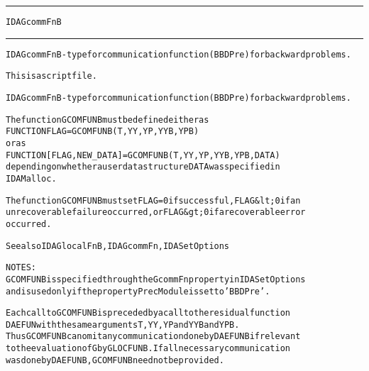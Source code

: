 \begin{samepage}
\hrule
\begin{center}
{\large \verb!IDAGcommFnB!}
\label{p:IDAGcommFnB}
\end{center}
\hrule\vspace{0.1in}



\begin{alltt}
IDAGcommFnB - type for communication function (BBDPre) for backward problems.
\end{alltt}

\end{samepage}



\begin{samepage}


\begin{alltt}
This is a script file. 
\end{alltt}

\end{samepage}



\begin{alltt}
IDAGcommFnB - type for communication function (BBDPre) for backward problems.

   The function GCOMFUNB must be defined either as
        FUNCTION FLAG = GCOMFUNB(T, YY, YP, YYB, YPB)
   or as
        FUNCTION [FLAG, NEW_DATA] = GCOMFUNB(T, YY, YP, YYB, YPB, DATA)
   depending on whether a user data structure DATA was specified in
   IDAMalloc. 

   The function GCOMFUNB must set FLAG=0 if successful, FLAG&lt;0 if an
   unrecoverable failure occurred, or FLAG&gt;0 if a recoverable error
   occurred.

   See also IDAGlocalFnB, IDAGcommFn, IDASetOptions

   NOTES:
     GCOMFUNB is specified through the GcommFn property in IDASetOptions
     and is used only if the property PrecModule is set to 'BBDPre'.

     Each call to GCOMFUNB is preceded by a call to the residual function
     DAEFUN with the same arguments T, YY, YP and YYB and YPB.
     Thus GCOMFUNB can omit any communication done by DAEFUNB if relevant
     to the evaluation of G by GLOCFUNB. If all necessary communication
     was done by DAEFUNB, GCOMFUNB need not be provided.
\end{alltt}






\vspace{0.1in}